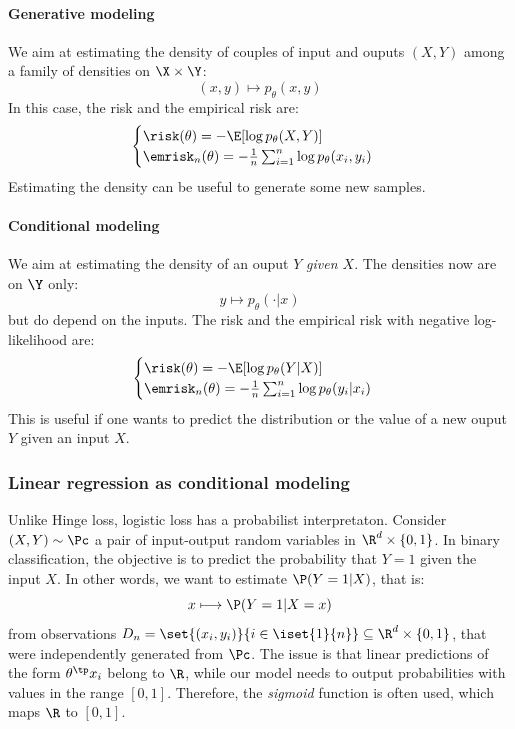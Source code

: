 \documentclass[toc, titlepaged]{../cs-classes/cs-classes}
\begin{document}
\paragraph*{Generative modeling}
We aim at estimating the density of couples of input and ouputs $(X, Y)$ among a family of densities on $\X\times\Y$:
\begin{equation*}
    (x, y) \longmapsto p_\theta(x, y)
\end{equation*}
In this case, the risk and the empirical risk are:
\begin{equation*}
    \begin{cases}
        \risk(\theta)=-\E[\log p_\theta(X, Y)]\\
        \emrisk_n(\theta) = -\frac{1}{n}\sum_{i=1}^n\log p_\theta(x_i, y_i)
    \end{cases}
\end{equation*}
Estimating the density can be useful to generate some new samples.

\paragraph*{Conditional modeling}
We aim at estimating the density of an ouput $Y$ \emph{given $X$}. The densities now are on $\Y$ only:
\begin{equation*}
    y \longmapsto p_\theta(\cdot|x)
\end{equation*}
but do depend on the inputs. The risk and the empirical risk with negative log-likelihood are:
\begin{equation*}
    \begin{cases}
        \risk(\theta)=-\E[\log p_\theta(Y|X)]\\
        \emrisk_n(\theta) = -\frac{1}{n}\sum_{i=1}^n\log p_\theta(y_i|x_i)
    \end{cases}
\end{equation*}
This is useful if one wants to predict the distribution or the value of a new ouput $Y$ given an input $X$.

\subsubsection{Linear regression as conditional modeling}
Unlike Hinge loss, logistic loss has a probabilist interpretaton. Consider $(X, Y)\sim\Pc$ a pair of input-output random variables in $\R^d\times\{0, 1\}$. In binary classification, the objective is to predict the probability that $Y=1$ given the input $X$. In other words, we want to estimate $\P(Y=1|X)$, that is:
\begin{equation*}
    x \longmapsto \P(Y=1|X=x)
\end{equation*}
from observations $D_n=\set{(x_i, y_i)}{i\in\iset{1}{n}}\subseteq\R^d\times\{0, 1\}$, that were independently generated from $\Pc$. The issue is that linear predictions of the form $\theta^\tp x_i$ belong to $\R$, while our model needs to output probabilities with values in the range $[0, 1]$. Therefore, the \emph{sigmoid} function is often used, which maps $\R$ to $[0, 1]$.
\end{document}
